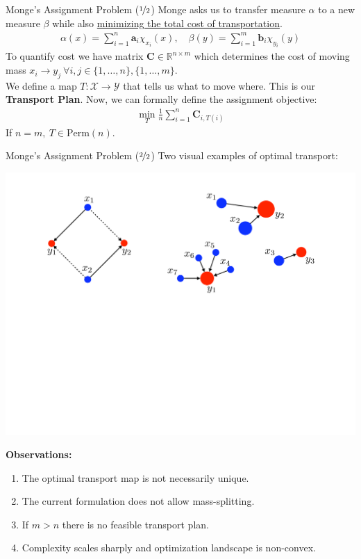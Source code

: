 \documentclass{beamer}
\begin{document}
\begin{frame}{Monge's Assignment Problem ($\nicefrac{1}{2}$)}
	Monge asks us to transfer measure $\alpha$ to a new measure $\beta$ while also \underline{minimizing the total cost of transportation}.
	\begin{gather}
		\alpha(x) = \sum^n_{i=1} \bm{a}_i \chi_{x_i}(x), \quad \beta(y) = \sum^m_{i=1} \bm{b}_i \chi_{y_i}(y)
	\end{gather} \pause
	To quantify cost we have matrix $\bm{C} \in \mathbb{R}^{n \times m}$ which determines the cost of moving mass $x_i \rightarrow y_j~\forall i,j \in \{1, \ldots, n\}, \{1, \ldots, m\}$. \pause \newline \\
	We define a map $T: \mathcal{X} \rightarrow \mathcal{Y}$ that tells us what to move where. This is our \textbf{Transport Plan}. \pause Now, we can formally define the assignment objective:
	\begin{gather}
		\min_{T} \frac{1}{n} \sum^n_{i=1} \bm{C}_{i, T(i)}
	\end{gather} \pause
	If $n = m,~T \in \text{Perm}(n)$.
\end{frame}

\begin{frame}{Monge's Assignment Problem ($\nicefrac{2}{2}$)}
	Two visual examples of optimal transport:
	\begin{center}
		\includegraphics[width=.8\textwidth]{img/non-unique-optimal-matching}
	\end{center} \pause
	\textbf{Observations:}
	\begin{enumerate}[label=\arabic*.]
		\item The optimal transport map is not necessarily unique. \pause
		\item The current formulation does not allow mass-splitting. \pause
		\item If $m > n$ there is no feasible transport plan. \pause
		\item Complexity scales sharply and optimization landscape is non-convex.
	\end{enumerate}
\end{frame}
\end{document}
